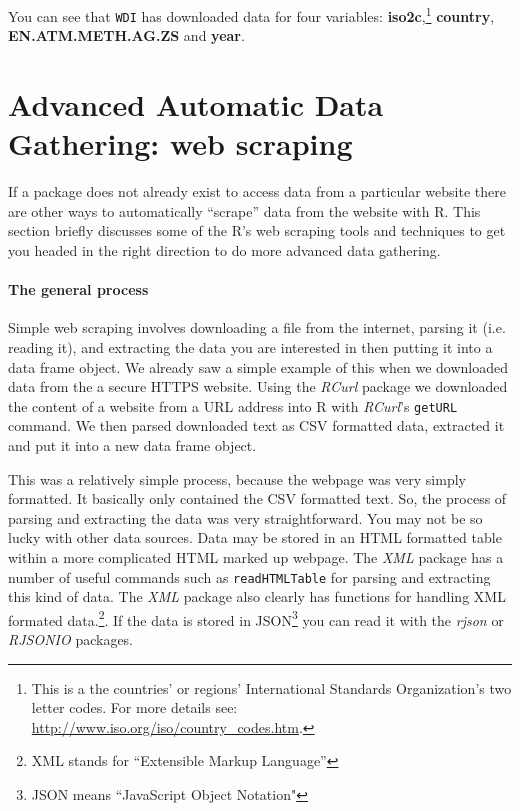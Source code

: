 \noindent You can see that \texttt{WDI} has downloaded data for four variables: \textbf{iso2c},\footnote{This is a the countries' or regions' International Standards Organization's two letter codes. For more details see: \url{http://www.iso.org/iso/country_codes.htm}.} \textbf{country}, \textbf{EN.ATM.METH.AG.ZS} and \textbf{year}.

\section{Advanced Automatic Data Gathering: web scraping}

If a package does not already exist to access data from a particular website there are other ways to automatically ``scrape'' data from the website with R. This section briefly discusses some of the R's web scraping tools and techniques to get you headed in the right direction to do more advanced data gathering.

\paragraph{The general process}

Simple web scraping involves downloading a file from the internet, parsing it (i.e. reading it), and extracting the data you are interested in then putting it into a data frame object. We already saw a simple example of this when we downloaded data from the a secure HTTPS website. Using the \emph{RCurl} package we downloaded the content of a website from a URL address into R with \emph{RCurl}'s \texttt{getURL} command. We then parsed downloaded text as CSV formatted data, extracted it and put it into a new data frame object. 

This was a relatively simple process, because the webpage was very simply formatted. It basically only contained the CSV formatted text. So, the process of parsing and extracting the data was very straightforward. You may not be so lucky with other data sources. Data may be stored in an HTML formatted table within a more complicated HTML marked up webpage. The \emph{XML} package \citep{R-XML} has a number of useful commands such as \texttt{readHTMLTable} for parsing and extracting this kind of data. The \emph{XML} package also clearly has functions for handling XML formated data.\footnote{XML stands for ``Extensible Markup Language''}. If the data is stored in JSON\footnote{JSON means ``JavaScript Object Notation"} you can read it with the \emph{rjson} \citep{R-rjson} or \emph{RJSONIO} \citep{R-RJSONIO} packages.

